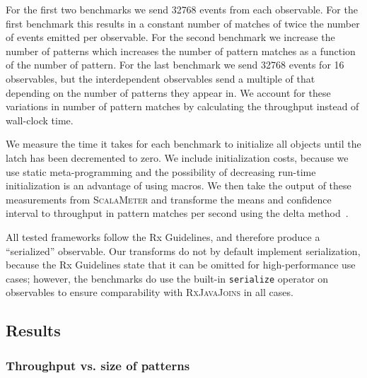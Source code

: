 \documentclass[runningheads]{llncs}
\begin{document}
\begin{sloppypar}
For the first two benchmarks we send 32768 events from each observable. For
the first benchmark this results in a constant number of matches of twice the
number of events emitted per observable. For the second benchmark we increase
the number of patterns which increases the number of pattern matches as a
function of the number of pattern. For the last benchmark we send 32768 events
for 16 observables, but the interdependent observables send a multiple of that
depending on the number of patterns they appear in. We account for these
variations in number of pattern matches by calculating the throughput instead
of wall-clock time.

We measure the time it takes for each benchmark to initialize all objects
until the latch has been decremented to zero. We include initialization costs,
because we use static meta-programming and the possibility of decreasing
run-time initialization is an advantage of using macros. We then take the output
of these measurements from \textsc{ScalaMeter} and transforme the means and
confidence interval to throughput in pattern matches per second using the
delta method~\cite{Casella:2002}.

All tested frameworks follow the Rx Guidelines, and therefore produce a
``serialized'' observable. Our transforms do not by default implement
serialization, because the Rx Guidelines state that it can be omitted for
high-performance use cases; however, the benchmarks do use the built-in
\texttt{serialize} operator on observables to ensure comparability with
\textsc{RxJavaJoins} in all cases.

\subsection{Results}

\captionsetup[figure]{labelsep=space}


\subsubsection{Throughput vs. size of patterns}


\end{sloppypar}
\end{document}
